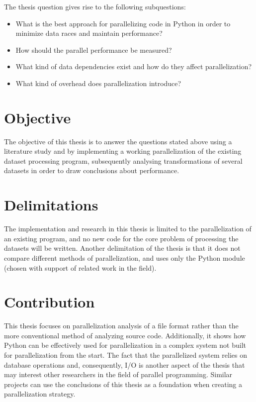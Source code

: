 The thesis question gives rise to the following subquestions:
\begin{itemize}
    \item What is the best approach for parallelizing code in Python in order to minimize data races and maintain performance?
    \item How should the parallel performance be measured?
    \item What kind of data dependencies exist and how do they affect parallelization?
    \item What kind of overhead does parallelization introduce?
\end{itemize}

\section{Objective}
The objective of this thesis is to answer the questions stated above using a literature study and by implementing a working parallelization
of the existing dataset processing program, subsequently analysing transformations of several datasets in order to draw conclusions about performance.

\section{Delimitations}
The implementation and research in this thesis is limited to the parallelization of an existing program, and no new code for the core problem
of processing the datasets will be written. Another delimitation of the thesis is that it does not compare different methods of parallelization,
and uses only the Python  module (chosen with support of related work in the field).

\section{Contribution}
This thesis focuses on parallelization analysis of a file format rather than the more conventional method of analyzing source code. Additionally,
it shows how Python can be effectively used for parallelization in a complex system not built for parallelization from the start. The fact that
the parallelized system relies on database operations and, consequently, I/O is another aspect of the thesis that may interest other researchers
in the field of parallel programming. Similar projects can use the conclusions of this thesis as a foundation when creating a parallelization strategy.
